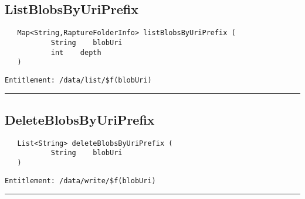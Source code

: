 \subsection{ListBlobsByUriPrefix}
\label{Api:ListBlobsByUriPrefix}
\begin{verbatim}
   Map<String,RaptureFolderInfo> listBlobsByUriPrefix (
           String    blobUri
           int    depth
   )
\end{verbatim}
\begin{Verbatim}[fontsize=\small, formatcom=\color{Maroon}]
  Entitlement: /data/list/$f(blobUri)
\end{Verbatim}



\rule{12cm}{2pt}
\subsection{DeleteBlobsByUriPrefix}
\label{Api:DeleteBlobsByUriPrefix}
\begin{verbatim}
   List<String> deleteBlobsByUriPrefix (
           String    blobUri
   )
\end{verbatim}
\begin{Verbatim}[fontsize=\small, formatcom=\color{Maroon}]
  Entitlement: /data/write/$f(blobUri)
\end{Verbatim}



\rule{12cm}{2pt}
